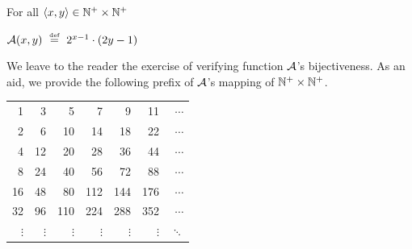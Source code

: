 \medskip

\noindent
For all $\langle x,y \rangle \in \mathbb{N}^+ \times \mathbb{N}^+$

$\mbox{$\cal A$}(x,y) \ \stackrel{\mbox{{\tiny def}}}{=} \ 2^{x-1} \cdot (2y -1)$

\noindent
We leave to the reader the exercise of verifying function $\mbox{$\cal A$}$'s bijectiveness.  As an aid, we provide the following prefix of $\mbox{$\cal A$}$'s mapping of $\mathbb{N}^+ \times \mathbb{N}^+$.
\begin{center}
\begin{tabular}{r|r|r|r|r|r|r}                                                               
 1 &  3 &   5 &   7 &   9 &  11 & $\cdots$ \\                                      
 2 &  6 &  10 &  14 &  18 &  22 & $\cdots$ \\                                      
 4 & 12 &  20 &  28 &  36 &  44 & $\cdots$ \\                                      
 8 & 24 &  40 &  56 &  72 &  88 & $\cdots$ \\                                            
16 & 48 &  80 & 112 & 144 & 176 & $\cdots$ \\
32 & 96 & 110 & 224 & 288 & 352 & $\cdots$ \\                                      
$\vdots$ & $\vdots$ & $\vdots$  & $\vdots$ & $\vdots$ & $\vdots$ & $\ddots$
\end{tabular} 
\end{center}
